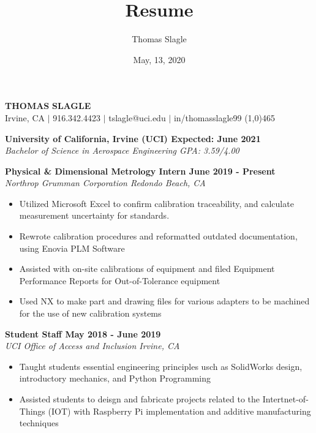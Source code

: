 \documentclass[10pt]{article}
\def\doubleline{
    \hspace{\fill}\color{blue}\line(1,0){465}\hspace{\fill}
}
\newenvironment{indentsection}[1]%
{\begin{list}{}%
	{\setlength{\leftmargin}{#1}}%
	\item[]%
}
{\end{list}}
\begin{document}
\title{Resume}
\author{Thomas Slagle}
\date{May, 13, 2020}

\thispagestyle{empty}
\pagestyle{empty}


\begin{center}
    {\LARGE\textbf{T}\Large\textbf{HOMAS} \LARGE\textbf{S}\Large\textbf{LAGLE}} \\
    Irvine, CA $\mid$ 916.342.4423 $\mid$ tslagle@uci.edu $\mid$ in/thomasslagle99\doubleline
\end{center}



\begin{indentsection}{\parindent}
    \textbf{University of California, Irvine (UCI) \hfill Expected: June 2021}\\
    \textit{Bachelor of Science in Aerospace Engineering \hfill GPA: 3.59/4.00}
\end{indentsection}



\begin{indentsection}{\parindent}
    \textbf{Physical \& Dimensional Metrology Intern \hfill June 2019 - Present}\\
    \textit{Northrop Grumman Corporation \hfill Redondo Beach, CA}
    \begin{itemize}
        \item Utilized Microsoft Excel to confirm calibration traceability, and calculate measurement uncertainty for standards.
        \item Rewrote calibration procedures and reformatted outdated documentation, using Enovia PLM Software
        \item Assisted with on-site calibrations of equipment and filed Equipment Performance Reports for Out-of-Tolerance equipment
        \item Used NX to make part and drawing files for various adapters to be machined for the use of new calibration systems
    \end{itemize}

    \vspace{0.08in}

    \textbf{Student Staff \hfill May 2018 - June 2019}\\
    \textit{UCI Office of Access and Inclusion  \hfill Irvine, CA}
    \begin{itemize}
        \item Taught students essential engineering principles usch as SolidWorks design, introductory mechanics, and Python Programming
        \item Assisted students to deisgn and fabricate projects related to the Intertnet-of-Things (IOT) with Raspberry Pi implementation and additive manufacturing techniques
    \end{itemize}
\end{indentsection}
\end{document}
